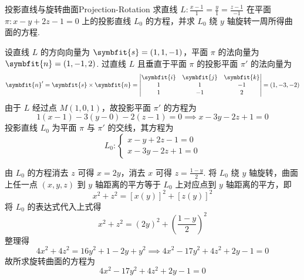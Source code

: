 \begin{problem}{投影直线与旋转曲面}{Projection-Rotation}
    求直线 $L : \frac{x-1}{1}=\frac{y}{1}=\frac{z-1}{-1}$ 在平面 $\pi : x-y+2z-1=0$ 上的投影直线 $L_0$ 的方程，并求 $L_0$ 绕 $y$ 轴旋转一周所得曲面的方程.
\end{problem}

\begin{solution}

    设直线 $L$ 的方向向量为 $\symbfit{s} = (1, 1, -1)$，平面 $\pi$ 的法向量为 $\symbfit{n} = (1, -1, 2)$.
    过直线 $L$ 且垂直于平面 $\pi$ 的投影平面 $\pi'$ 的法向量为
    \begin{equation}
        \symbfit{n}' = \symbfit{s} \times \symbfit{n} =
        \begin{vmatrix}
            \symbfit{i} & \symbfit{j} & \symbfit{k} \\
            1           & 1           & -1          \\
            1           & -1          & 2
        \end{vmatrix} = (1, -3, -2)
    \end{equation}
    由于 $L$ 经过点 $M(1, 0, 1)$，故投影平面 $\pi'$ 的方程为
    \begin{equation}
        1(x-1) - 3(y-0) - 2(z-1) = 0 \implies x - 3y - 2z + 1 = 0
    \end{equation}
    投影直线 $L_0$ 为平面 $\pi$ 与 $\pi'$ 的交线，其方程为
    \begin{equation}
        \boxed{L_0 : \begin{cases} x - y + 2z - 1 = 0 \\ x - 3y - 2z + 1 = 0 \end{cases}}
    \end{equation}


    由 $L_0$ 的方程消去 $z$ 可得 $x = 2y$，消去 $x$ 可得 $z = \frac{1-y}{2}$.
    将 $L_0$ 绕 $y$ 轴旋转，曲面上任一点 $(x, y, z)$ 到 $y$ 轴距离的平方等于 $L_0$ 上对应点到 $y$ 轴距离的平方，即
    \begin{equation}
        x^2 + z^2 = [x(y)]^2 + [z(y)]^2
    \end{equation}
    将 $L_0$ 的表达式代入上式得
    \begin{equation}
        x^2 + z^2 = (2y)^2 + \left( \frac{1-y}{2} \right)^2
    \end{equation}
    整理得
    \begin{equation}
        4x^2 + 4z^2 = 16y^2 + 1 - 2y + y^2 \implies 4x^2 - 17y^2 + 4z^2 + 2y - 1 = 0
    \end{equation}
    故所求旋转曲面的方程为
    \begin{equation}
        \boxed{4x^2 - 17y^2 + 4z^2 + 2y - 1 = 0}
    \end{equation}
\end{solution}


